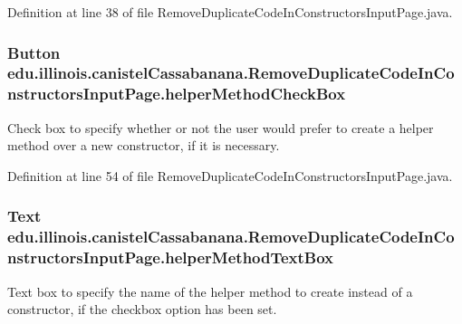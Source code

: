 Definition at line 38 of file RemoveDuplicateCodeInConstructorsInputPage.java.

\hypertarget{classedu_1_1illinois_1_1canistelCassabanana_1_1RemoveDuplicateCodeInConstructorsInputPage_ae4b00020b66a4de901af986961ea91e4}{
\subsubsection[{helperMethodCheckBox}]{\setlength{\rightskip}{0pt plus 5cm}Button {\bf edu.illinois.canistelCassabanana.RemoveDuplicateCodeInConstructorsInputPage.helperMethodCheckBox}}}
\label{classedu_1_1illinois_1_1canistelCassabanana_1_1RemoveDuplicateCodeInConstructorsInputPage_ae4b00020b66a4de901af986961ea91e4}
Check box to specify whether or not the user would prefer to create a helper method over a new constructor, if it is necessary. 

Definition at line 54 of file RemoveDuplicateCodeInConstructorsInputPage.java.

\hypertarget{classedu_1_1illinois_1_1canistelCassabanana_1_1RemoveDuplicateCodeInConstructorsInputPage_a55a3b8c570da15f43d270768908aeab3}{
\subsubsection[{helperMethodTextBox}]{\setlength{\rightskip}{0pt plus 5cm}Text {\bf edu.illinois.canistelCassabanana.RemoveDuplicateCodeInConstructorsInputPage.helperMethodTextBox}}}
\label{classedu_1_1illinois_1_1canistelCassabanana_1_1RemoveDuplicateCodeInConstructorsInputPage_a55a3b8c570da15f43d270768908aeab3}
Text box to specify the name of the helper method to create instead of a constructor, if the checkbox option has been set. 

